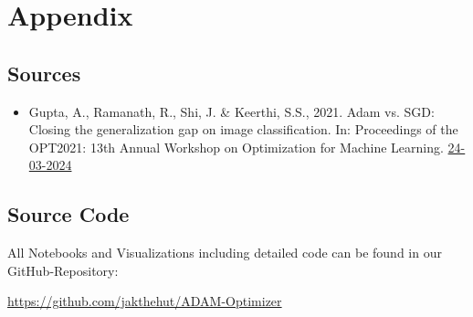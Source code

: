 \documentclass[oneside]{article}
\begin{document}
\onecolumn
\newpage
\pagestyle{fancy}


\section{Appendix}
\subsection{Sources}
\begin{itemize}
    \item Gupta, A., Ramanath, R., Shi, J. \& Keerthi, S.S., 2021. Adam vs. SGD: Closing the generalization gap on image classification. In: Proceedings of the OPT2021: 13th Annual Workshop on Optimization for Machine Learning. \href{chrome-extension://efaidnbmnnnibpcajpcglclefindmkaj/https://opt-ml.org/papers/2021/paper53.pdf}{24-03-2024}
\end{itemize}

\subsection{Source Code}
All Notebooks and Visualizations including detailed code can be found in our GitHub-Repository:\par
\href{https://github.com/jakthehut/ADAM-Optimizer}{https://github.com/jakthehut/ADAM-Optimizer}
\end{document}
